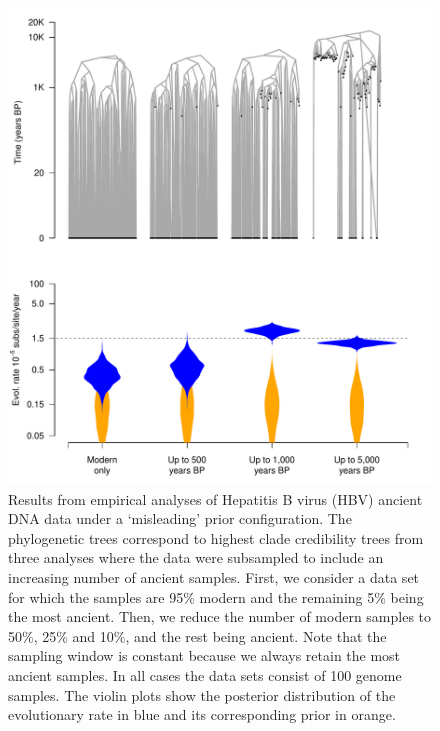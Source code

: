 \documentclass[11pt]{article}
\begin{document}
\begin{figure}[H]
    \begin{center}
        \includegraphics[scale=0.7, angle=0]{empirical_results_depth_misleading_prior.pdf}
        \caption{Results from empirical analyses of Hepatitis B virus (HBV) ancient DNA data under a `misleading' prior configuration. The phylogenetic trees correspond to highest clade credibility trees from three analyses where the data were subsampled to include an increasing number of ancient samples. First, we consider a data set for which the samples are 95\% modern and the remaining 5\% being the most ancient. Then, we reduce the number of modern samples to 50\%, 25\% and 10\%, and the rest being ancient. Note that the sampling window is constant because we always retain the most ancient samples. In all cases the data sets consist of 100 genome samples. The violin plots show the posterior distribution of the evolutionary rate in blue and its corresponding prior in orange.}
        \label{figure:Fig6}
    \end{center}
\end{figure}
\end{document}
